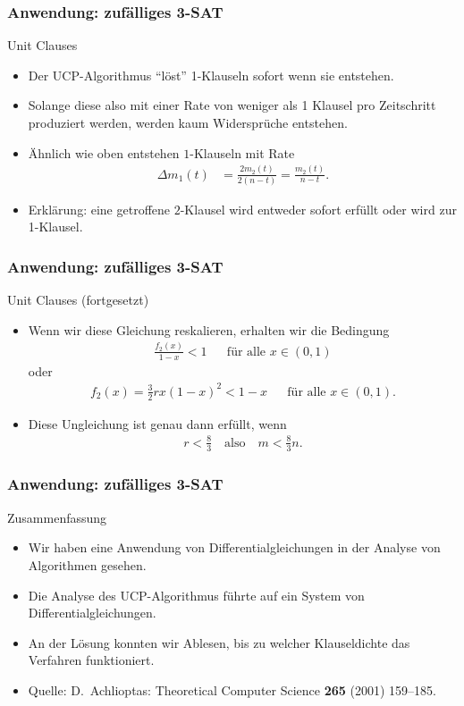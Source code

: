 \documentclass{beamer}
\newcommand{\mytitle}{Anwendung: zuf\"alliges 3-SAT}
\begin{document}
\begin{frame}\frametitle{\mytitle}
	\begin{block}{Unit Clauses}
		\begin{itemize}
		\item Der UCP-Algorithmus ``l\"ost'' 1-Klauseln sofort wenn sie entstehen.
		\item Solange diese also mit einer Rate von weniger als 1 Klausel pro Zeitschritt produziert werden, werden kaum Widerspr\"uche entstehen.
		\item \"Ahnlich wie oben entstehen $1$-Klauseln mit Rate
			\begin{align*}
				\Delta m_1(t)&=\frac{2m_2(t)}{2(n-t)}=\frac{m_2(t)}{n-t}.
			\end{align*}
		\item \alert{Erkl\"arung:} eine getroffene $2$-Klausel wird entweder sofort erf\"ullt oder wird zur 1-Klausel.
		\end{itemize}
	\end{block}
\end{frame}

\begin{frame}\frametitle{\mytitle}
	\begin{block}{Unit Clauses (fortgesetzt)}
		\begin{itemize}
		\item Wenn wir diese Gleichung reskalieren, erhalten wir die Bedingung
			\begin{align*}
				\frac{f_2(x)}{1-x}<1&&\mbox{f\"ur alle }x\in(0,1)
			\end{align*}
			oder
			\begin{align*}
				f_2(x)=\frac{3}{2}rx(1-x)^2<1-x&&\mbox{f\"ur alle }x\in(0,1).
			\end{align*}
		\item Diese Ungleichung ist genau dann erf\"ullt, wenn
			\begin{align*}
				r<\frac{8}{3}\quad\mbox{also}\quad m<\frac{8}{3}n.
			\end{align*}
		\end{itemize}
	\end{block}
\end{frame}

\begin{frame}\frametitle{\mytitle}
	\begin{block}{Zusammenfassung}
		\begin{itemize}
			\item Wir haben eine Anwendung von Differentialgleichungen in der Analyse von Algorithmen gesehen.
			\item Die Analyse des UCP-Algorithmus f\"uhrte auf ein System von Differentialgleichungen.
			\item An der L\"osung konnten wir Ablesen, bis zu welcher Klauseldichte das Verfahren funktioniert.
			\item \alert{Quelle:} D.~Achlioptas: Theoretical Computer Science {\bf265} (2001) 159--185.
		\end{itemize}
	\end{block}
\end{frame}
\end{document}
